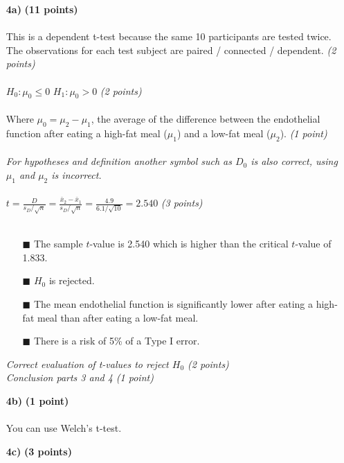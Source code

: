 \begin{itemize}
\item[\textbf{4a)}] \textbf{(11 points)} \\ \\
This is a dependent t-test because the same 10 participants are tested twice. The observations for each test subject are paired / connected / dependent. \textit{(2 points)}\\ \\
$H_0: \mu_0 \leq 0$ \hspace{3cm} $H_1: \mu_0 > 0$ \hspace{3cm} \textit{(2 points)} \\ \\
Where $\mu_0 = \mu_2 - \mu_1$, the average of the difference between the endothelial function after eating a high-fat meal ($\mu_1$) and a low-fat meal ($\mu_2$). \textit{(1 point)} \\ \\ 
\textit{For hypotheses and definition another symbol such as $D_0$ is also correct, using $\mu_1$ and $\mu_2$ is incorrect.} \\ \\
$t = \frac{D}{s_D / \sqrt{n}} = \frac{\bar{x}_2 - \bar{x}_1}{s_D / \sqrt{n}} = \frac{4.9}{6.1 / \sqrt{10}} = 2.540$ \textit{(3 points)}\\ \\
        \begin{itemize}
        \item[$\blacksquare$] The sample $t$-value is 2.540 which is higher than the critical $t$-value of 1.833.
        \item[$\blacksquare$] $H_0$ is rejected.
        \item[$\blacksquare$] The mean endothelial function is significantly lower after eating a high-fat meal than after eating a low-fat meal.
\item[$\blacksquare$] There is a risk of 5\% of a Type I error.
        \end{itemize}
        \textit{Correct evaluation of t-values to reject $H_0$ (2 points) \\ Conclusion parts 3 and 4 (1 point)} \\
\item[\textbf{4b)}] \textbf{(1 point)} \\ \\
You can use Welch’s t-test. \\
\item[\textbf{4c)}] \textbf{(3 points)} \\

\end{itemize}
